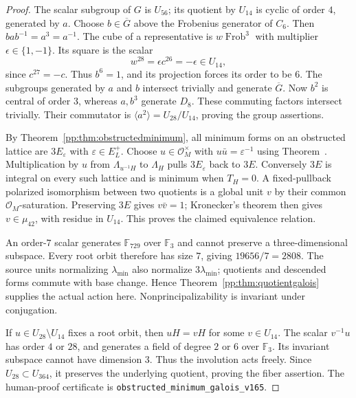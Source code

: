 \begin{proof}
The scalar subgroup of $G$ is $U_{56}$; its quotient by $U_{14}$
is cyclic of order $4$, generated by $a$. Choose $b\in\overline G$
above the Frobenius generator of $C_6$. Then $bab^{-1}=a^3=a^{-1}$.
The cube of a representative is $w\operatorname{Frob}^3$ with
multiplier $\epsilon\in\{1,-1\}$. Its square is the scalar
\[
 w^{28}=\epsilon c^{26}=-\epsilon\in U_{14},
\]
since $c^{27}=-c$. Thus $b^6=1$, and its projection forces its
order to be $6$. The subgroups generated by $a$ and $b$ intersect
trivially and generate $\overline G$. Now $b^2$ is central of order
$3$, whereas $a,b^3$ generate $D_8$. These commuting factors
intersect trivially. Their commutator is $\langle a^2\rangle
=U_{28}/U_{14}$, proving the group assertions.

By Theorem~\ref{pp:thm:obstructedminimum}, all minimum forms on an
obstructed lattice are $3E_\varepsilon$ with $\varepsilon\in E_L^+$.
Choose $u\in\mathcal O_M^\times$ with $u\bar u=\varepsilon^{-1}$
using Theorem~. Multiplication by $u$ from
$\Lambda_{u^{-1}H}$ to $\Lambda_H$ pulls $3E_\varepsilon$ back to
$3E$. Conversely $3E$ is integral on every such lattice and is
minimum when $T_H=0$. A fixed-pullback polarized isomorphism between
two quotients is a global unit $v$ by their common
$\mathcal O_M$-saturation. Preserving $3E$ gives $v\bar v=1$;
Kronecker's theorem then gives $v\in\mu_{42}$, with residue in
$U_{14}$. This proves the claimed equivalence relation.

An order-$7$ scalar generates $\mathbb F_{729}$ over $\mathbb F_3$
and cannot preserve a three-dimensional subspace. Every root orbit
therefore has size $7$, giving $19656/7=2808$. The source units
normalizing $\lambda_{\min}$ also normalize $3\lambda_{\min}$;
quotients and descended forms commute with base change. Hence
Theorem~\ref{pp:thm:quotientgalois} supplies the actual action here.
Nonprincipalizability is invariant under conjugation.

If $u\in U_{28}\setminus U_{14}$ fixes a root orbit, then $uH=vH$
for some $v\in U_{14}$. The scalar $v^{-1}u$ has order $4$ or $28$,
and generates a field of degree $2$ or $6$ over $\mathbb F_3$.
Its invariant subspace cannot have dimension $3$. Thus the involution
acts freely. Since $U_{28}\subset U_{364}$, it preserves the
underlying quotient, proving the fiber assertion. The human-proof
certificate is \texttt{obstructed\_minimum\_galois\_v165}.
\end{proof}

